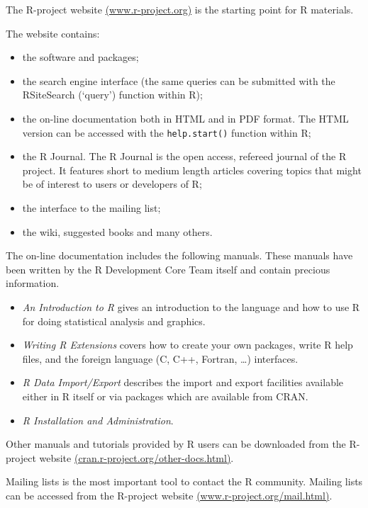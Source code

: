 \documentclass[]{book}
\providecommand{\tightlist}{%
  \setlength{\itemsep}{0pt}\setlength{\parskip}{0pt}}
\def\tightlist{}
\begin{document}
The R-project website
\href{http://www.r-project.org/}{(www.r-project.org)} is the starting
point for R materials.

The website contains:

\begin{itemize}
\tightlist
\item
  the software and packages;
\item
  the search engine interface (the same queries can be submitted with
  the RSiteSearch (`query') function within R);
\item
  the on-line documentation both in HTML and in PDF format. The HTML
  version can be accessed with the \texttt{help.start()} function within
  R;
\item
  the R Journal. The R Journal is the open access, refereed journal of
  the R project. It features short to medium length articles covering
  topics that might be of interest to users or developers of R;
\item
  the interface to the mailing list;
\item
  the wiki, suggested books and many others.
\end{itemize}

The on-line documentation includes the following manuals. These manuals
have been written by the R Development Core Team itself and contain
precious information.

\begin{itemize}
\tightlist
\item
  \emph{An Introduction to R} gives an introduction to the language and
  how to use R for doing statistical analysis and graphics.
\item
  \emph{Writing R Extensions} covers how to create your own packages,
  write R help files, and the foreign language (C, C++, Fortran,
  \ldots{}) interfaces.
\item
  \emph{R Data Import/Export} describes the import and export facilities
  available either in R itself or via packages which are available from
  CRAN.
\item
  \emph{R Installation and Administration}.
\end{itemize}

Other manuals and tutorials provided by R users can be downloaded from
the R-project website
\href{http://cran.r-project.org/other-docs.html}{(cran.r-project.org/other-docs.html)}.

Mailing lists is the most important tool to contact the R community.
Mailing lists can be accessed from the R-project website
\href{http://www.r-project.org/mail.html}{(www.r-project.org/mail.html)}.
\end{document}
